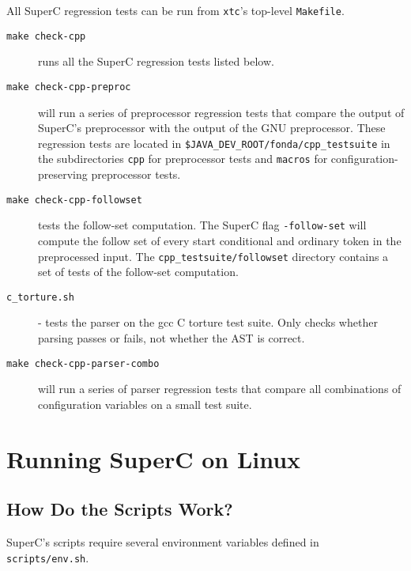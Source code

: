 \documentclass{report}
\newcommand{\SuperC}{{\textsf{Su\-perC}}}
\begin{document}
All \SuperC{} regression tests can be run from \verb"xtc"'s top-level
\verb"Makefile".

\begin{description}

\item[\texttt{make check-cpp}] runs all the \SuperC{} regression tests listed
  below.

\item[\texttt{make check-cpp-preproc}] will run a series of preprocessor
  regression tests that compare the output of SuperC's preprocessor
  with the output of the GNU preprocessor.  These regression tests are
  located in \verb"$JAVA_DEV_ROOT/fonda/cpp_testsuite" in the
  subdirectories \verb"cpp" for preprocessor tests and \verb"macros" for
  configuration-preserving preprocessor tests.

\item[\texttt{make check-cpp-followset}] tests the follow-set
  computation. The SuperC flag \verb"-follow-set" will compute the follow
  set of every start conditional and ordinary token in the
  preprocessed input.  The \verb"cpp_testsuite/followset" directory contains
  a set of tests of the follow-set computation.

\item[\texttt{c\_torture.sh}] - tests the parser on the gcc C torture test
  suite.  Only checks whether parsing passes or fails, not whether the
  AST is correct.

\item[\texttt{make check-cpp-parser-combo}] will run a series of parser
  regression tests that compare all combinations of configuration
  variables on a small test suite.
\end{description}



\chapter{Running \SuperC{} on Linux}
\label{chapter:linux}



\section{How Do the Scripts Work?}

SuperC's scripts require several environment variables defined in
\verb"scripts/env.sh".
\end{document}
